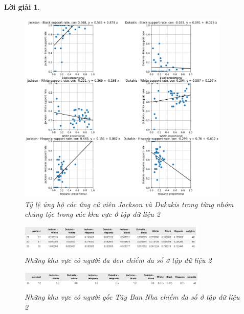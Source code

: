 \documentclass[14pt, a4paper]{article}
\theoremstyle{sltheorem}
\theoremstyle{soltheorem}
\newtheorem*{loigiai}{Lời giải}
\begin{document}
\begin{loigiai}
\begin{enumerate}
    \begin{figure}[H]
        \centering
        \includegraphics[width=0.9\textwidth]{figures/race_rate_and_candidate_support_rate.png}
        \caption{Tỷ lệ ủng hộ các ứng cử viên Jackson và Dukakis trong từng nhóm chủng tộc trong các khu vực ở tập dữ liệu 2}
        \label{fig:Dukakis_candidate_relationship_factor}
    \end{figure}

    \begin{figure}[H]
        \centering
        \includegraphics[width=0.8\textwidth]{figures/Predominant_black_dataset_2.png}
        \caption{Những khu vực có người da đen chiếm đa số ở tập dữ liệu 2}
        \label{fig:Predominant_black_dataset_2}
    \end{figure}

    \begin{figure}[H]
        \centering
        \includegraphics[width=0.8\textwidth]{figures/Predominant_hispanic_dataset_2.png}
        \caption{Những khu vực có người gốc Tây Ban Nha chiếm đa số ở tập dữ liệu 2}
        \label{fig:Predominant_hispanic_dataset_2}
    \end{figure}


\end{enumerate}
\end{loigiai}
\end{document}
